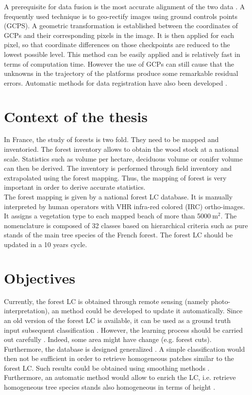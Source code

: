 A prerequisite for data fusion is the most accurate alignment of the two data \citep{torabzadeh2014fusion}. A frequently used technique is to geo-rectify images using ground controls points (GCPS). A geometric transformation is established between the coordinates of GCPs and their corresponding pixels in the image. It is then applied for each pixel, so that coordinate differences on those checkpoints are reduced to the lowest possible level. This method can be easily applied and is relatively fast in terms of computation time. However the use of GCPs can still cause that the unknowns in the trajectory of the platforms produce some remarkable residual errors. Automatic methods for data registration have also been developed \citep{habib2005photogrammetric,mastin2009automatic}. \\

\section{Context of the thesis}
In France, the study of forests is two fold. They need to be mapped and inventoried. The forest inventory allows to obtain the wood stock at a national scale. Statistics such as volume per hectare, deciduous volume or conifer volume can then be derived. The inventory is performed through field inventory and extrapolated using the forest mapping. Thus, the mapping of forest is very important in order to derive accurate statistics. \\
The forest mapping is given by a national forest LC database. It is manually interpreted by human operators with VHR infra-red colored (IRC) ortho-images. It assigns a vegetation type to each mapped beach of more than 5000$\:$m$^{2}$. The nomenclature is composed of 32 classes based on hierarchical criteria such as pure stands of the main tree species of the French forest. The forest LC should be updated in a 10 years cycle.

\section{Objectives}
Currently, the forest LC is obtained through remote sensing (namely photo-inter\-pretation), an method could be developed to update it automatically. Since an old version of the forest LC is available, it can be used as a ground truth input subsequent classification \citep{gressin2013updating}. However, the learning process should be carried out carefully \citep{gressin2014updating}. Indeed, some area might have change (e.g. forest cuts). Furthermore, the database is designed generalized \citep{smith1977database}. A simple classification would then not be sufficient in order to retrieve homogeneous patches similar to the forest LC. Such results could be obtained using smoothing methods \citep{schindler2012overview}. Furthermore, an automatic method would allow to enrich the LC, i.e. retrieve homogeneous tree species stands also homogeneous in terms of height \citep{gressin2014unified}.

